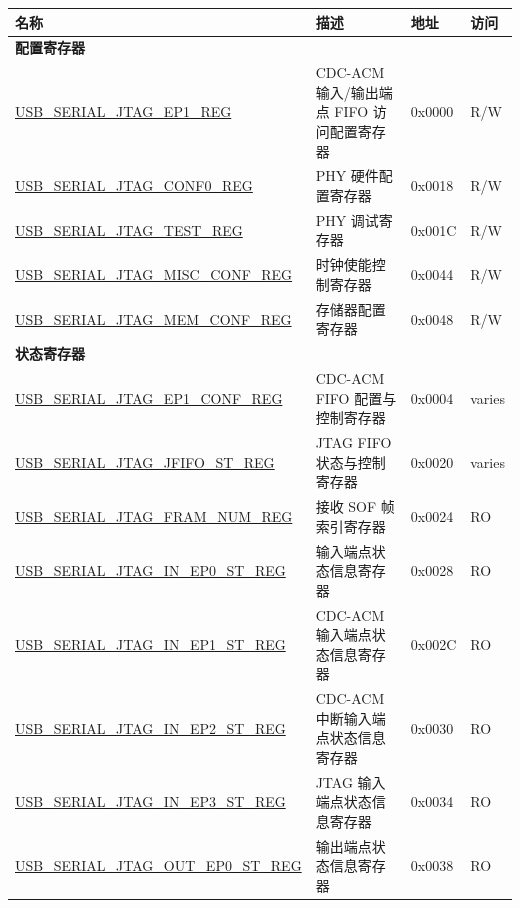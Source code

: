 \begin{longtable}{ | p{6cm} | p{7.2cm} | p{1.3cm} | p{1cm} | }
\hline\rowcolor{lightgray}
名称 & 描述 &  地址 & 访问 \\ \hline
\endhead
\multicolumn{4}{|l|}{\textbf{配置寄存器}} \\ \hline
\hyperref[regdesc:USBSERIALJTAGEP1REG]{USB\_SERIAL\_JTAG\_EP1\_REG} & CDC-ACM 输入/输出端点 FIFO 访问配置寄存器 & 0x0000 & R/W \\ \hline
\hyperref[regdesc:USBSERIALJTAGCONF0REG]{USB\_SERIAL\_JTAG\_CONF0\_REG} & PHY 硬件配置寄存器 & 0x0018 & R/W \\ \hline
\hyperref[regdesc:USBSERIALJTAGTESTREG]{USB\_SERIAL\_JTAG\_TEST\_REG} & PHY 调试寄存器 & 0x001C & R/W \\ \hline
\hyperref[regdesc:USBSERIALJTAGMISCCONFREG]{USB\_SERIAL\_JTAG\_MISC\_CONF\_REG} & 时钟使能控制寄存器 & 0x0044 & R/W \\ \hline
\hyperref[regdesc:USBSERIALJTAGMEMCONFREG]{USB\_SERIAL\_JTAG\_MEM\_CONF\_REG} & 存储器配置寄存器 & 0x0048 & R/W \\ \hline
\multicolumn{4}{|l|}{\textbf{状态寄存器}} \\ \hline
\hyperref[regdesc:USBSERIALJTAGEP1CONFREG]{USB\_SERIAL\_JTAG\_EP1\_CONF\_REG} & CDC-ACM FIFO 配置与控制寄存器 & 0x0004 & varies \\ \hline
\hyperref[regdesc:USBSERIALJTAGJFIFOSTREG]{USB\_SERIAL\_JTAG\_JFIFO\_ST\_REG} & JTAG FIFO 状态与控制寄存器 & 0x0020 & varies \\ \hline
\hyperref[regdesc:USBSERIALJTAGFRAMNUMREG]{USB\_SERIAL\_JTAG\_FRAM\_NUM\_REG} & 接收 SOF 帧索引寄存器 & 0x0024 & RO \\ \hline
\hyperref[regdesc:USBSERIALJTAGINEP0STREG]{USB\_SERIAL\_JTAG\_IN\_EP0\_ST\_REG} & 输入端点状态信息寄存器 & 0x0028 & RO \\ \hline
\hyperref[regdesc:USBSERIALJTAGINEP1STREG]{USB\_SERIAL\_JTAG\_IN\_EP1\_ST\_REG} & CDC-ACM 输入端点状态信息寄存器 & 0x002C & RO \\ \hline
\hyperref[regdesc:USBSERIALJTAGINEP2STREG]{USB\_SERIAL\_JTAG\_IN\_EP2\_ST\_REG} & CDC-ACM 中断输入端点状态信息寄存器 & 0x0030 & RO \\ \hline
\hyperref[regdesc:USBSERIALJTAGINEP3STREG]{USB\_SERIAL\_JTAG\_IN\_EP3\_ST\_REG} & JTAG 输入端点状态信息寄存器 & 0x0034 & RO \\ \hline
\hyperref[regdesc:USBSERIALJTAGOUTEP0STREG]{USB\_SERIAL\_JTAG\_OUT\_EP0\_ST\_REG} & 输出端点状态信息寄存器 & 0x0038 & RO \\ \hline

\end{longtable}
